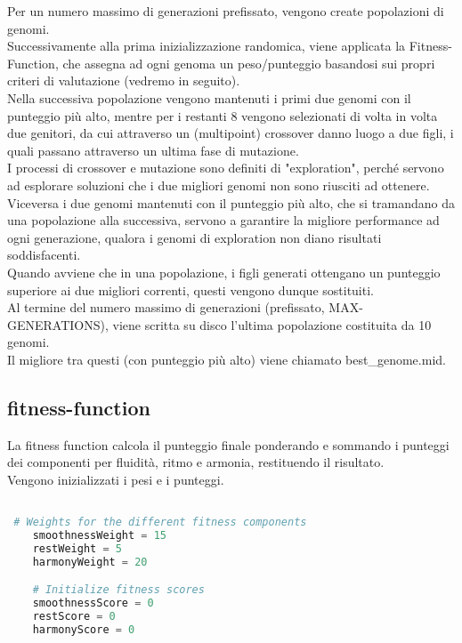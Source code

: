 \documentclass[a4paper,12pt]{report}
\begin{document}
Per un numero massimo di generazioni prefissato, vengono create popolazioni di genomi. \\
Successivamente alla prima inizializzazione randomica, viene applicata la Fitness-Function, che assegna ad ogni genoma un peso/punteggio basandosi sui propri criteri di valutazione (vedremo in seguito). \\
Nella successiva popolazione vengono mantenuti i primi due genomi con il punteggio più alto, mentre per i restanti 8 vengono selezionati di volta in volta due genitori, da cui attraverso un (multipoint) crossover danno luogo a due figli, i quali passano attraverso un ultima fase di mutazione. \\
I processi di crossover e mutazione sono definiti di "exploration", perché servono ad esplorare soluzioni che i due migliori genomi non sono riusciti ad ottenere. \\
Viceversa i due genomi mantenuti con il punteggio più alto, che si tramandano da una popolazione alla successiva, servono a garantire la migliore performance ad ogni generazione, qualora i genomi di exploration non diano risultati soddisfacenti. \\
Quando avviene che in una popolazione, i figli generati ottengano un punteggio superiore ai due migliori correnti, questi vengono dunque sostituiti. \\
Al termine del numero massimo di generazioni (prefissato, MAX-GENERATIONS), viene scritta su disco l'ultima popolazione costituita da 10 genomi. \\
Il migliore tra questi (con punteggio più alto) viene chiamato best_genome.mid. 

\subsection{fitness-function}

La fitness function calcola il punteggio finale ponderando e sommando i punteggi dei componenti per fluidità, ritmo e armonia, restituendo il risultato. \\
Vengono inizializzati i pesi e i punteggi.

\begin{lstlisting}[language=Python]

 # Weights for the different fitness components
    smoothnessWeight = 15
    restWeight = 5
    harmonyWeight = 20

    # Initialize fitness scores
    smoothnessScore = 0
    restScore = 0
    harmonyScore = 0
    
\end{lstlisting}
\end{document}
